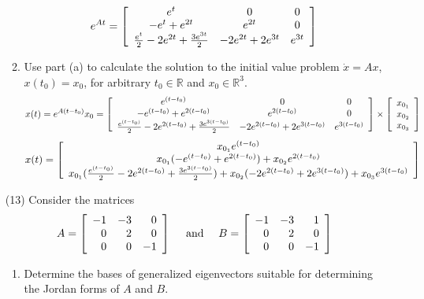 \documentclass[12pt,letterpaper,reqno]{amsart}
\newcommand{\R}{\mathbb R}
\begin{document}
\begin{enumerate}
\begin{enumerate}
\begin{flushleft}
    $$e^{A t} = \left[ \begin{array} { c c c } { e^t } & { 0 } & { 0 } \\ { -e^t+e^{2t} } & { e^{2t} } & { 0 } \\ { \frac{e^t}{2}-2e^{2t}+\frac{3e^{3t}}{2} } & { -2e^{2t}+2e^{3t} } & { e^{3t} } \end{array} \right]$$
    \end{flushleft}
    \item Use part (a) to calculate the solution to the initial value problem $\dot{x} = Ax$, $x(t_0) = x_0$, for arbitrary $t_0 \in \R$ and $x_0 \in \R^3$.
    $$x(t) = e^{A (t-t_0)}x_0 = \left[ \begin{array} { c c c } { e^{(t-t_0)} } & { 0 } & { 0 } \\ { -e^{(t-t_0)}+e^{2(t-t_0)} } & { e^{2(t-t_0)} } & { 0 } \\ { \frac{e^{(t-t_0)}}{2}-2e^{2(t-t_0)}+\frac{3e^{3(t-t_0)}}{2} } & { -2e^{2(t-t_0)}+2e^{3(t-t_0)} } & { e^{3(t-t_0)} } \end{array} \right] \times \left[ \begin{array} { l l l } { x_{0_1} } \\ { x_{0_2} } \\ { x_{0_3} } \end{array} \right]$$
    $$x(t) = \left[ \begin{array} { c c c } { x_{0_1}e^{(t-t_0)} } \\ { x_{0_1}(-e^{(t-t_0)}+e^{2(t-t_0)}) + x_{0_2}e^{2(t-t_0)} } \\ { x_{0_1}(\frac{e^{(t-t_0)}}{2}-2e^{2(t-t_0)}+\frac{3e^{3(t-t_0)}}{2}) + x_{0_2}(-2e^{2(t-t_0)}+2e^{3(t-t_0)}) + x_{0_3}e^{3(t-t_0)} } \end{array} \right]$$
\end{enumerate}
\newpage
\item[(13)] Consider the matrices \newline
$$A = \left[ \begin{array} { r r r } { - 1 } & { - 3 } & { 0 } \\ { 0 } & { 2 } & { 0 } \\ { 0 } & { 0 } & { - 1 } \end{array} \right] \quad \text { and } \quad B = \left[ \begin{array} { r r r } { - 1 } & { - 3 } & { 1 } \\ { 0 } & { 2 } & { 0 } \\ { 0 } & { 0 } & { - 1 } \end{array} \right]$$
\begin{enumerate}
    \item Determine the bases of generalized eigenvectors suitable for determining the Jordan forms of $A$ and $B$.\newline
    

\end{enumerate}
\end{enumerate}
\end{document}
